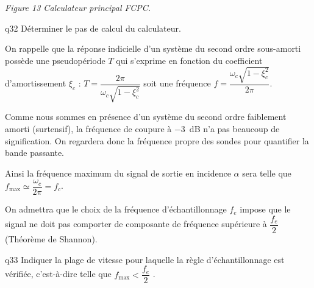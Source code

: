 \begin{multicols}{2}
\begin{center}
\textit{Figure 13 Calculateur principal FCPC.}
\end{center}


{\begin{question}{q32}
Déterminer le pas de calcul du calculateur.
\ifprof
\begin{corrige}
\end{corrige}
\else
\fi
\begin{reponses}
\end{reponses} \end{question}}  

On rappelle que la réponse indicielle d’un système du second ordre sous-amorti possède une pseudopériode $T$ qui s’exprime en fonction du coefficient d’amortissement $\xi_c$ :
$T=\dfrac{2\pi}{\omega_c \sqrt{1-\xi_c^2}}$ 
soit une fréquence $f=\dfrac{\omega_c\sqrt{1-\xi_c^2}}{2\pi}$.


Comme nous sommes en présence d’un système du second ordre faiblement amorti (surtensif), la
fréquence de coupure à \SI{-3}{dB} n’a pas beaucoup de signification. On regardera donc la fréquence propre
des sondes pour quantifier la bande passante.

Ainsi la fréquence maximum du signal de sortie en incidence $\alpha$ sera telle que $f_{\text{max}}\simeq \dfrac{\omega_c}{2\pi}=f_c$. 

On admettra que le choix de la fréquence d’échantillonnage $f_e$ impose que le signal ne doit pas comporter de composante de fréquence supérieure à $\dfrac{f_e}{2}$ (Théorème de Shannon).



{\begin{question}{q33}
Indiquer la plage de vitesse pour laquelle la règle d’échantillonnage est vérifiée, c’est-à-dire telle que $f_{\text{max}}<\dfrac{f_e}{2}$ .
\ifprof
\begin{corrige}
\end{corrige}
\else
\fi
\begin{reponses}
\end{reponses} \end{question}}  



\end{multicols}

